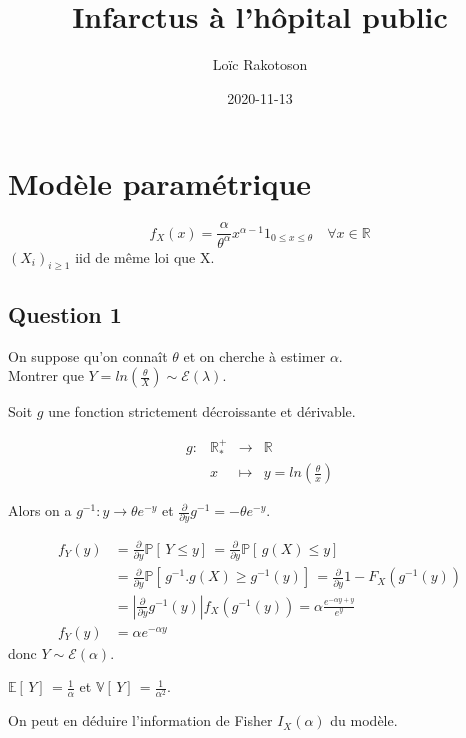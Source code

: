 \documentclass[
  12pt,
]{scrreprt}
\title{Infarctus à l'hôpital public}
\author{Loïc Rakotoson}
\date{2020-11-13}
\begin{document}
\maketitle

\hypertarget{moduxe8le-paramuxe9trique}{%
\chapter{Modèle paramétrique}\label{moduxe8le-paramuxe9trique}}

\[f_X(x) = \frac{\alpha}{\theta^\alpha} x^{\alpha-1} {1}_{0 \leq x \leq \theta} \quad \forall x \in \mathbb{R} \]
\((X_i)_{i \geq 1}\) iid de même loi que X.

\hypertarget{question-1}{%
\section{Question 1}\label{question-1}}

On suppose qu'on connaît \(\theta\) et on cherche à estimer \(\alpha\).\\
Montrer que \(Y = ln(\frac{\theta}{X}) \sim \mathcal{E}(\lambda)\).

Soit \(g\) une fonction strictement décroissante et dérivable.

\[\begin{aligned}
g:&\mathbb{R}_{*}^+&\longrightarrow &\mathbb{R}\\
&x&\longmapsto&y = ln(\frac{\theta}{x})
\end{aligned}\]

Alors on a \(g^{-1}:y\to \theta e^{-y}\) et \(\frac{\partial}{\partial y}g^{-1} = -\theta e^{-y}\).

\[\begin{aligned}
f_Y(y)&=\frac{\partial}{\partial y}\mathbb{P}[\,Y\leq y]\, = \frac{\partial}{\partial y}\mathbb{P}[\,g(X)\leq y]\,\\
&=\frac{\partial}{\partial y}\mathbb{P}[\,g^{-1}.g(X)\geq g^{-1}(y)]\,=\frac{\partial}{\partial y} 1-F_X(g^{-1}(y))\\
&=\left |\frac{\partial}{\partial y}g^{-1}(y)\right | f_X(g^{-1}(y)) = \alpha \frac{e^{-\alpha y+y}}{e^{y}}\\
f_Y(y)&=\alpha e^{-\alpha y}
\end{aligned}\]
donc \(Y \sim \mathcal{E}(\alpha)\).

\(\mathbb{E}[\,Y]\,=\frac{1}{\alpha}\) et \(\mathbb{V}[\,Y]\,=\frac{1}{\alpha^{2}}\).

On peut en déduire l'information de Fisher \(I_X(\alpha)\) du modèle.
\end{document}
